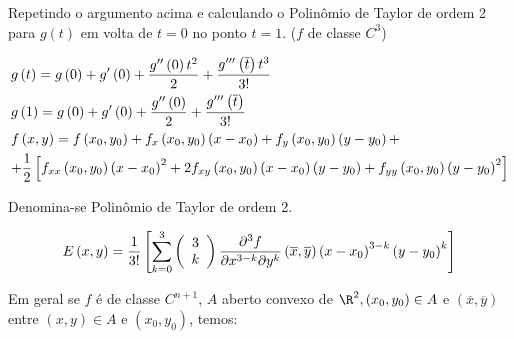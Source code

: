 \documentclass{book}
\begin{document}
\begin{sol}
Repetindo o argumento acima e calculando o Polin\^omio de Taylor de ordem 2 para $g(t)$ em volta de $t=0$ no ponto $t=1$. ($f$ de classe $C^3$)

\[
\begin{gathered}
  g\left( t \right) = g\left( 0 \right) + g'\left( 0 \right) + \frac{{g''\left( 0 \right)t^2 }}
{2} + \frac{{g'''\left( {\overline t } \right)t^3 }}
{{3!}} \hfill \\
  g\left( 1 \right) = g\left( 0 \right) + g'\left( 0 \right) + \frac{{g''\left( 0 \right)}}
{2} + \frac{{g'''\left( {\overline t } \right)}}
{{3!}} \hfill \\
  f\left( {x,y} \right) = f\left( {x_0 ,y_0 } \right) + f_x \left( {x_0 ,y_0 } \right)\left( {x - x_0 } \right) + f_y \left( {x_0 ,y_0 } \right)\left( {y - y_0 } \right) +  \hfill \\
 + \frac{1}{2}\left[ {f_{xx} \left( {x_0 ,y_0 } \right)\left( {x - x_0 } \right)^2  + 2f_{xy} \left( {x_0 ,y_0 } \right)\left( {x - x_0 } \right)\left( {y - y_0 } \right) + f_{yy} \left( {x_0 ,y_0 } \right)\left( {y - y_0 } \right)^2 } \right] \hfill \\
\end{gathered}
\]

Denomina-se Polin\^omio de Taylor de ordem 2.

\[
E\left( {x,y} \right) = \frac{1}
{{3!}}\left[ {\sum\limits_{k = 0}^3 {\left( {\begin{array}{*{20}c}
3  \\
k  \\

\end{array} } \right)\frac{{\partial ^3 f}}
{{\partial x^{3 - k} \partial y^k }}\left( {\overline x ,\overline y } \right)\left( {x - x_0 } \right)^{3 - k} \left( {y - y_0 } \right)^k } } \right]
\]

\end{sol}

Em geral se $f$ \'e de classe $C^{n+1}$, $A$ aberto convexo de $\R^2, \left( {x_0 ,y_0 } \right) \in A$ e $\left( {\overline x ,\overline y } \right)$ entre $\left( {x,y} \right) \in A$ e $\left( {x_0 ,y_0 } \right)$, temos:
\end{document}
